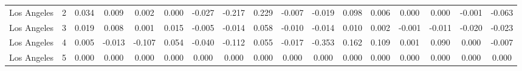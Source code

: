 \begin{tabular}[t]{ccccccccccccccccc}
Los Angeles & 2 & 0.034 & 0.009 & 0.002 & 0.000 & -0.027 & -0.217 & 0.229 & -0.007 & -0.019 & 0.098 & 0.006 & 0.000 & 0.000 & -0.001 & -0.063\\
Los Angeles & 3 & 0.019 & 0.008 & 0.001 & 0.015 & -0.005 & -0.014 & 0.058 & -0.010 & -0.014 & 0.010 & 0.002 & -0.001 & -0.011 & -0.020 & -0.023\\
Los Angeles & 4 & 0.005 & -0.013 & -0.107 & 0.054 & -0.040 & -0.112 & 0.055 & -0.017 & -0.353 & 0.162 & 0.109 & 0.001 & 0.090 & 0.000 & -0.007\\
Los Angeles & 5 & 0.000 & 0.000 & 0.000 & 0.000 & 0.000 & 0.000 & 0.000 & 0.000 & 0.000 & 0.000 & 0.000 & 0.000 & 0.000 & 0.000 & 0.000\\
\bottomrule
\end{tabular}